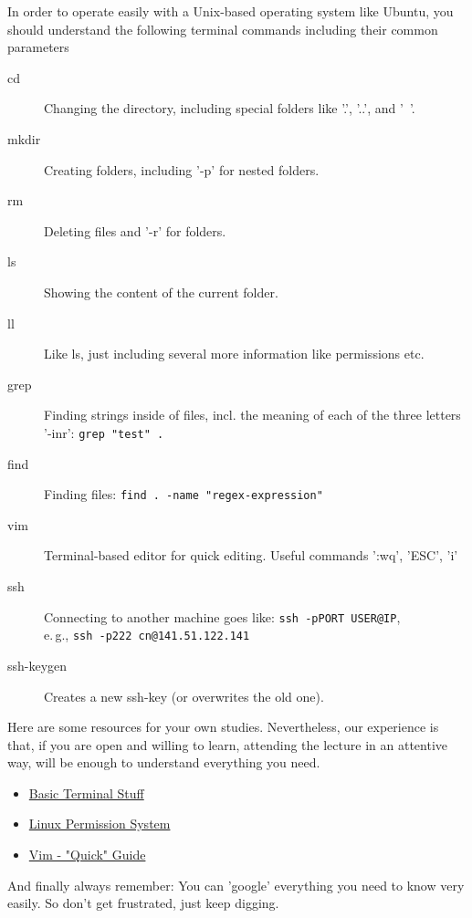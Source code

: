 In order to operate easily with a Unix-based operating system like Ubuntu, you should understand the following terminal commands including their common parameters 

\begin{description}
\item [cd] Changing the directory, including special folders like '.', '..', and '~'.
\item [mkdir] Creating folders, including '-p' for nested folders.
\item [rm] Deleting files and '-r' for folders.
\item [ls] Showing the content of the current folder.
\item [ll] Like ls, just including several more information like permissions etc.
\item [grep] Finding strings inside of files, incl. the meaning of each of the three letters '-inr': \verb#grep "test" .# 
\item [find] Finding files: \verb#find . -name "regex-expression"#
\item [vim] Terminal-based editor for quick editing. Useful commands ':wq', 'ESC', 'i'
\item [ssh] Connecting to another machine goes like: \verb#ssh -pPORT USER@IP#,\\e.\,g., \verb#ssh -p222 cn@141.51.122.141#
\item [ssh-keygen] Creates a new ssh-key (or overwrites the old one).
\end{description}

Here are some resources for your own studies. Nevertheless, our experience is that, if you are open and willing to learn, attending the lecture in an attentive way, will be enough to understand everything you need.
\begin{itemize}
\item \href{https://www.digitalocean.com/community/tutorials/an-introduction-to-linux-basics}{Basic Terminal Stuff}
\item \href{https://www.digitalocean.com/community/tutorials/linux-permissions-basics-and-how-to-use-umask-on-a-vps}{Linux Permission System}
\item \href{https://www.tutorialspoint.com/vim/vim_quick_guide.htm}{Vim - "Quick" Guide}
\end{itemize}

And finally always remember: You can 'google' everything you need to know very easily. So don't get frustrated, just keep digging.
